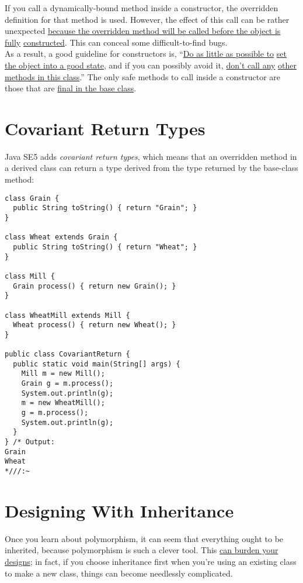 \documentclass[10pt,letterpaper]{report}
\begin{document}
If you call a dynamically-bound method inside a constructor, the overridden definition for that method is used. However, the effect of this call can be rather unexpected \underline{because the overridden method will be called before the object is} \underline{fully} \underline{constructed}. This can conceal some difficult-to-find bugs.\\

As a result, a good guideline for constructors is, ``\underline{Do as little as possible to} \underline{set the object into a good state}, and if you can possibly avoid it, \underline{don't call any} \underline{other methods in this class}.'' The only safe methods to call inside a constructor are those that are \underline{final in the base class}.\\
\section{Covariant Return Types}
Java SE5 adds \textit{covariant return types}, which means that an overridden method in a derived class can return a type derived from the type returned by the base-class method:
\begin{lstlisting}
class Grain {
  public String toString() { return "Grain"; }
}

class Wheat extends Grain {
  public String toString() { return "Wheat"; }
}

class Mill {
  Grain process() { return new Grain(); }
}

class WheatMill extends Mill {
  Wheat process() { return new Wheat(); }
}

public class CovariantReturn {
  public static void main(String[] args) {
    Mill m = new Mill();
    Grain g = m.process();
    System.out.println(g);
    m = new WheatMill();
    g = m.process();
    System.out.println(g);
  }
} /* Output:
Grain
Wheat
*///:~
\end{lstlisting}
\section{Designing With Inheritance}
Once you learn about polymorphism, it can seem that everything ought to be inherited, because polymorphism is such a clever tool. This \underline{can burden your} \underline{designs}; in fact, if you choose inheritance first when you're using an existing class to make a new class, things can become needlessly complicated.\\
\end{document}
